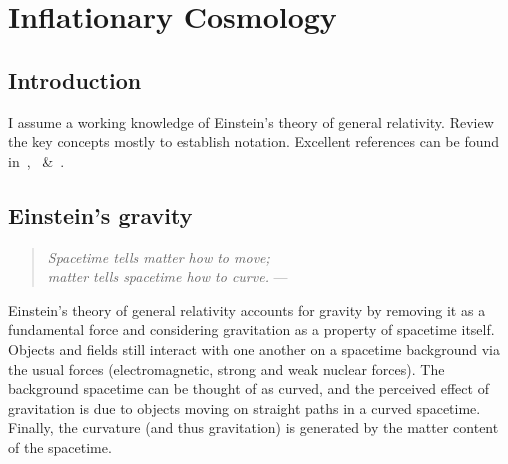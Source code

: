 \chapter{Inflationary Cosmology}
\label{chap:cos}

\section{Introduction}
\label{sec:cos:intro}

I assume a working knowledge of Einstein's theory of general relativity. Review the key concepts mostly to establish notation. Excellent references can be found in~\cite{Wald},~\cite{Hobson} \&~\cite{Dodelson}.

\section{Einstein's gravity}
\label{sec:cos:einsteins_gravity}
\begin{quote}
  {\em Spacetime tells matter how to move;\\ matter tells spacetime how to curve.}\hfill
  --- \johnwheeler{}
\end{quote}

Einstein's theory of general relativity accounts for gravity by removing it as a fundamental force and considering gravitation as a property of spacetime itself. Objects and fields still interact with one another on a spacetime background via the usual forces (electromagnetic, strong and weak nuclear forces). The background spacetime can be thought of as curved, and the perceived effect of gravitation is due to objects moving on straight paths in a curved spacetime. Finally, the curvature (and thus gravitation) is generated by the matter content of the spacetime.

